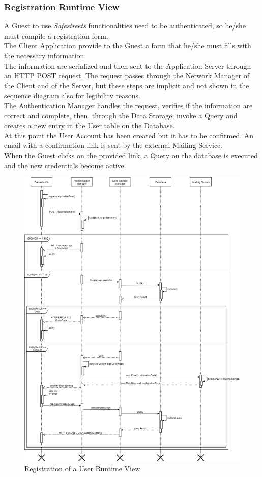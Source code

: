 \subsubsection{Registration Runtime View}
A Guest to use \textit{Safestreets} functionalities need to be authenticated, so he/she must compile a registration form.\\
The Client Application provide to the Guest a form that he/she must fills with the necessary information.\\
The information are serialized and then sent to the Application Server through an HTTP POST request. The request passes through the Network Manager of the Client and of the Server, but these steps are implicit and not shown in the sequence diagram also for legibility reasons.\\
The Authentication Manager handles the request, verifies if the information are correct and complete, then, through the Data Storage, invoke a Query and creates a new entry in the User table on the Database.\\
At this point the User Account has been created but it has to be confirmed. An email with a confirmation link is sent by the external Mailing Service.\\
When the Guest clicks on the provided link, a Query on the database is executed and the new credentials become active.
\begin{figure}[H]
          \includegraphics[scale=0.4]{Images/Seq_registration.png}
        \caption{Registration of a User Runtime View}
\end{figure}

